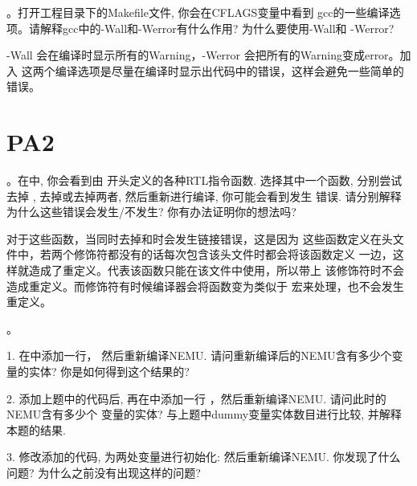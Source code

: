 \vspace{0.5em}

  。打开工程目录下的Makefile文件, 你会在CFLAGS变量中看到
  gcc的一些编译选项。请解释gcc中的-Wall和-Werror有什么作用? 为什么要使用-Wall和
  -Werror?

\vspace{0.5em}

  -Wall 会在编译时显示所有的Warning，-Werror 会把所有的Warning变成error。加入
  这两个编译选项是尽量在编译时显示出代码中的错误，这样会避免一些简单的错误。

\section{PA2}

  。在中, 你会看到由
  开头定义的各种RTL指令函数. 选择其中一个函数, 分别尝试去掉
  , 去掉或去掉两者, 然后重新进行编译, 你可能会看到发生
  错误. 请分别解释为什么这些错误会发生/不发生? 你有办法证明你的想法吗?

\vspace{0.5em}

  对于这些函数，当同时去掉和时会发生链接错误，这是因为
  这些函数定义在头文件中，若两个修饰符都没有的话每次包含该头文件时都会将该函数定义
  一边，这样就造成了重定义。代表该函数只能在该文件中使用，所以带上
  该修饰符时不会造成重定义。而修饰符有时候编译器会将函数变为类似于
  宏来处理，也不会发生重定义。

\vspace{0.5em}

  。

  1. 在中添加一行，
  然后重新编译NEMU. 请问重新编译后的NEMU含有多少个变量的实体? 
  你是如何得到这个结果的?

  2. 添加上题中的代码后, 再在中添加一行
  ，然后重新编译NEMU. 请问此时的NEMU含有多少个
  变量的实体? 与上题中dummy变量实体数目进行比较, 并解释本题的结果.

  3. 修改添加的代码, 为两处变量进行初始化:
  然后重新编译NEMU. 你发现了什么问题? 为什么之前没有出现这样的问题?

